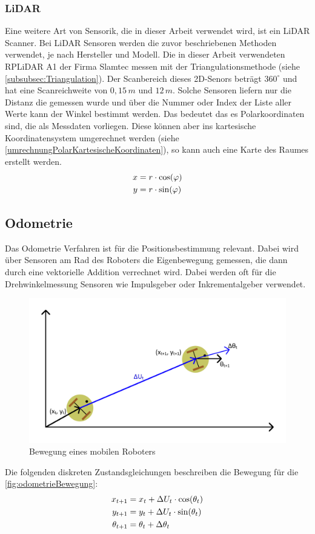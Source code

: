 \subsubsection{LiDAR}
Eine weitere Art von Sensorik, die in dieser Arbeit verwendet wird, ist ein LiDAR Scanner. Bei LiDAR Sensoren werden die zuvor beschriebenen Methoden verwendet, je nach Hersteller und Modell. Die in dieser Arbeit verwendeten RPLiDAR A1 der Firma Slamtec messen mit der Triangulationsmethode (siehe \autoref{subsubsec:Triangulation}). Der Scanbereich dieses 2D-Senors beträgt $360^\circ$ und hat eine Scanreichweite von $0,15\, m$ und $12\, m$. Solche Sensoren liefern nur die Distanz die gemessen wurde und über die Nummer oder Index der Liste aller Werte kann der Winkel bestimmt werden. Das bedeutet das es Polarkoordinaten sind, die als Messdaten vorliegen. Diese können aber ins kartesische Koordinatensystem umgerechnet werden (siehe \autoref{umrechnungPolarKartesischeKoordinaten}), so kann auch eine Karte des Raumes erstellt werden. 
\begin{align}\label{umrechnungPolarKartesischeKoordinaten}
\centering
\begin{split}
x &= r \cdot \cos(\varphi) \\
y &= r \cdot \sin(\varphi)
\end{split}
\end{align}

\subsection{Odometrie}
Das Odometrie Verfahren ist für die Positionsbestimmung relevant. Dabei wird über Sensoren am Rad des Roboters die Eigenbewegung gemessen, die dann durch eine vektorielle Addition verrechnet wird. Dabei werden oft für die Drehwinkelmessung Sensoren wie Impulsgeber oder Inkrementalgeber verwendet. 
\begin{figure}[H]
 \centering
 \includegraphics[width=0.9\linewidth]{Bilder/Grundlagen/odometrie.png}
 \caption{Bewegung eines mobilen Roboters}
 \label{fig:odometrieBewegung}
\end{figure}
Die folgenden diskreten Zustandsgleichungen beschreiben die Bewegung für die  \autoref{fig:odometrieBewegung}:
\begin{align}\label{odometrieZustandsgleichung}
\centering
x_{t+1} &= x_{t} + \Delta U_{t} \cdot \cos(\theta_{t}) \\
y_{t+1} &= y_{t} + \Delta U_{t} \cdot \sin(\theta_{t}) \\
\theta_{t+1} &= \theta_{t} + \Delta\theta_{t}
\end{align}

